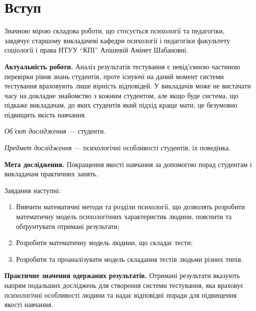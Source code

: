 \chapter*{Вступ}

Значною мірою складова роботи, що стосується психології та педагогіки, завдячує
старшому викладачеві кафедри психології і педагогіки
факультету соціології і права НТУУ ``КПІ'' Апішевій Амінет Шабановні.

\textbf{Актуальність роботи.}
Аналіз результатів тестування є невід’ємною частиною перевірки рівня знань
студентів, проте існуючі на даний момент системи тестування враховують
лише вірність відповідей.
У викладачів може не вистачати часу на докладне знайомство з кожним студентом,
але якщо буде система, що підкаже викладачам, до яких
студентів який підхід краще мати, це безумовно підвищить якість навчання.

\textit{Об’єкт дослідження} ---
студенти.

\textit{Предмет дослідження} ---
психологічні особливості студентів, їх поведінка.

\textbf{Мета дослідження.}
Покращення якості навчання за допомогою порад студентам і викладачам
практичних занять.

Завдання наступні:
\begin{enumerate}
  \item
    Вивчити математичні методи та розділи психології, що дозволять розробити
    математичну модель психологічних характеристик людини,
    пояснити та обґрунтувати отримані результати;
  \item
    Розробити математичну модель людини, що складає тести;
  \item
    Розробити та проаналізувати модель складання тестів людьми різних типів.
\end{enumerate}

\textbf{Практичне значення одержаних результатів.}
Отримані результати
вказують напрям подальших досліджень для створення системи тестування,
яка враховує психологічні особливості людини та надає відповідні поради
для підвищення якості навчання.
